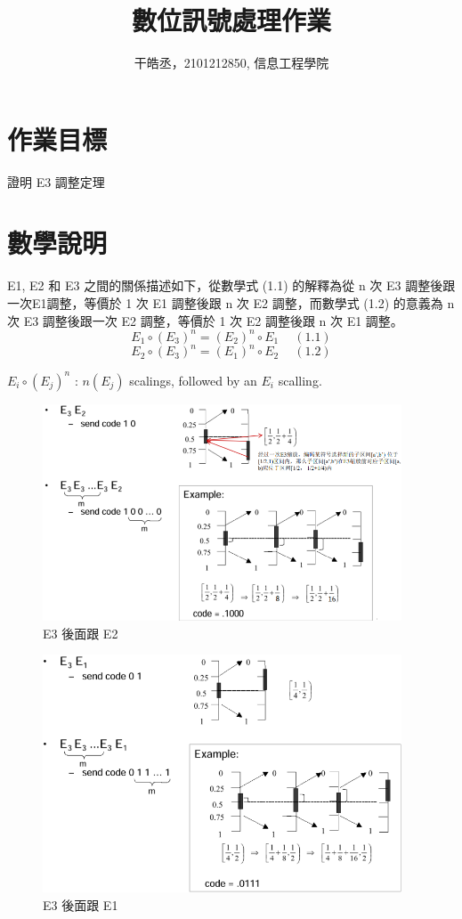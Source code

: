 \documentclass[11pt,UTF8]{ctexart}
\title{數位訊號處理作業}
\author{干皓丞，2101212850, 信息工程學院}
\begin{document}
\maketitle


\section{作業目標}

證明 E3 調整定理

\section{數學說明}

E1, E2 和 E3 之間的關係描述如下，從數學式 (1.1) 的解釋為從 n 次 E3 調整後跟一次E1調整，等價於 1 次 E1 調整後跟 n 次 E2 調整，而數學式 (1.2) 的意義為 n 次 E3 調整後跟一次 E2 調整，等價於 1 次 E2 調整後跟 n 次 E1 調整。
\newline
$$E_{1} \circ (E_{3})^n = (E_{2})^n \circ E_{1} \quad \ (1.1) $$
$$E_{2} \circ (E_{3})^n = (E_{1})^n \circ E_{2} \quad \ (1.2) $$

$E_{i} \circ (E_{j})^n$ : $ n (E_{j})$ scalings, followed by an $E_{i}$ scalling.

\begin{figure}[H]
\centering 
\includegraphics[width=0.95\textwidth]{gp1.png} 
\caption{E3 後面跟 E2}
\label{Test}
\end{figure}

\begin{figure}[H]
\centering 
\includegraphics[width=0.95\textwidth]{gp2.png} 
\caption{E3 後面跟 E1}
\label{Test}
\end{figure}
\end{document}
